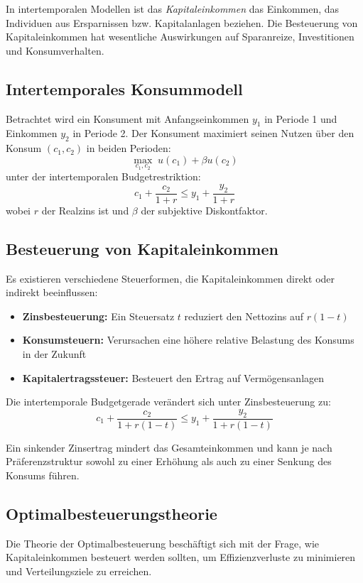 In intertemporalen Modellen ist das \emph{Kapitaleinkommen} das Einkommen, das Individuen aus Ersparnissen bzw. Kapitalanlagen beziehen. Die Besteuerung von Kapitaleinkommen hat wesentliche Auswirkungen auf Sparanreize, Investitionen und Konsumverhalten.

\subsection{Intertemporales Konsummodell}

Betrachtet wird ein Konsument mit Anfangseinkommen \( y_1 \) in Periode 1 und Einkommen \( y_2 \) in Periode 2. Der Konsument maximiert seinen Nutzen über den Konsum \( (c_1, c_2) \) in beiden Perioden:
\[
\max_{c_1, c_2} \; u(c_1) + \beta u(c_2)
\]
unter der intertemporalen Budgetrestriktion:
\[
c_1 + \frac{c_2}{1+r} \leq y_1 + \frac{y_2}{1+r}
\]
wobei \( r \) der Realzins ist und \( \beta \) der subjektive Diskontfaktor.

\subsection{Besteuerung von Kapitaleinkommen}

Es existieren verschiedene Steuerformen, die Kapitaleinkommen direkt oder indirekt beeinflussen:

\begin{itemize}
    \item \textbf{Zinsbesteuerung:} Ein Steuersatz \( t \) reduziert den Nettozins auf \( r(1-t) \)
    \item \textbf{Konsumsteuern:} Verursachen eine höhere relative Belastung des Konsums in der Zukunft
    \item \textbf{Kapitalertragssteuer:} Besteuert den Ertrag auf Vermögensanlagen
\end{itemize}

Die intertemporale Budgetgerade verändert sich unter Zinsbesteuerung zu:
\[
c_1 + \frac{c_2}{1+r(1-t)} \leq y_1 + \frac{y_2}{1+r(1-t)}
\]


Ein sinkender Zinsertrag mindert das Gesamteinkommen und kann je nach Präferenzstruktur sowohl zu einer Erhöhung als auch zu einer Senkung des Konsums führen.

\subsection{Optimalbesteuerungstheorie}

Die Theorie der Optimalbesteuerung beschäftigt sich mit der Frage, wie Kapitaleinkommen besteuert werden sollten, um Effizienzverluste zu minimieren und Verteilungsziele zu erreichen.

